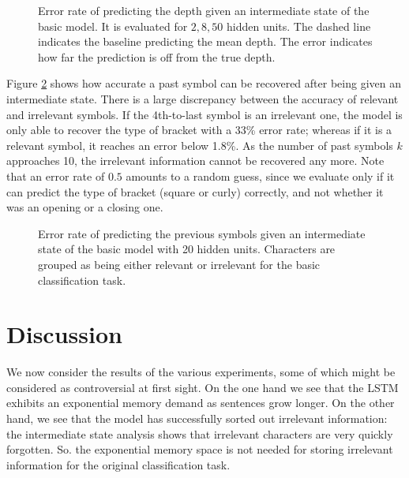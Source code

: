 \documentclass[11pt,a4paper]{article}
\newlength\figureheight
\newlength\figurewidth
\begin{document}
\setlength\figureheight{6cm}
\setlength{}
\begin{figure}[ht]
    \caption{Error rate of predicting the depth given an intermediate state of the basic model. It is evaluated for $2,8,50$ hidden units. The dashed line indicates the baseline predicting the mean depth. The error indicates how far the prediction is off from the true depth.}%
    \label{fig:analysis_depth_results}%
\end{figure}

Figure \ref{fig:analysis_previous_results} shows how accurate a past symbol can be recovered after being given an intermediate state. There is a large discrepancy between the accuracy of relevant and irrelevant symbols. If the 4th-to-last symbol is an irrelevant one, the model is only able to recover the type of bracket with a 33\% error rate; whereas if it is a relevant symbol, it reaches an error below 1.8\%. As the number of past symbols $k$ approaches 10, the irrelevant information cannot be recovered any more. Note that an error rate of $0.5$ amounts to a random guess, since we evaluate only if it can predict the type of bracket (square or curly) correctly, and not whether it was an opening or a closing one.

\setlength\figureheight{4cm}
\setlength\figurewidth{\linewidth}
\begin{figure}[ht]
    \caption{Error rate of predicting the previous symbols given an intermediate state of the basic model with 20 hidden units. Characters are grouped as being either relevant or irrelevant for the basic classification task.}%
    \label{fig:analysis_previous_results}%
\end{figure}

\section{Discussion}

We now consider the results of the various experiments, some of which might be considered as controversial at first sight. On the one hand we see that the LSTM exhibits an exponential memory demand as sentences grow longer. On the other hand, we see that the model has successfully sorted out irrelevant information: the intermediate state analysis shows that irrelevant characters are very quickly forgotten. So. the exponential memory space is not needed for storing irrelevant information for the original classification task.
\end{document}
